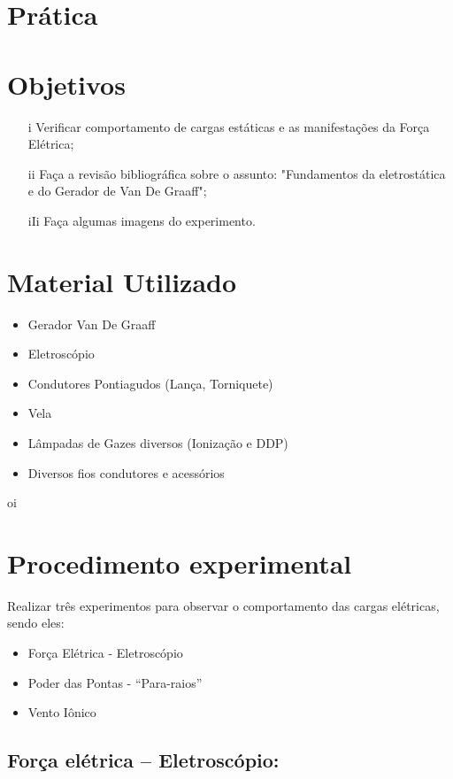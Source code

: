 \section*{Prática}
\section{Objetivos}
\begin{itemize}
    \item[i] Verificar comportamento de cargas estáticas e as manifestações da Força Elétrica;
    \item[ii] Faça a revisão bibliográfica sobre o assunto: "Fundamentos da eletrostática e do Gerador de Van De Graaff";
    \item[iIi] Faça algumas imagens do experimento.
\end{itemize}

\section{Material Utilizado}
\begin{itemize}
    \item Gerador Van De Graaff
    \item Eletroscópio
    \item Condutores Pontiagudos (Lança, Torniquete)
    \item Vela
    \item Lâmpadas de Gazes diversos (Ionização e DDP)
    \item Diversos fios condutores e acessórios
\end{itemize}
\par 
\noindent oi

\section{Procedimento experimental}
Realizar três experimentos para observar o comportamento das cargas elétricas, sendo eles:

\begin{itemize}
    \item  Força Elétrica - Eletroscópio
    \item  Poder das Pontas - “Para-raios”
    \item  Vento Iônico
\end{itemize}

\subsection{Força elétrica – Eletroscópio:}

